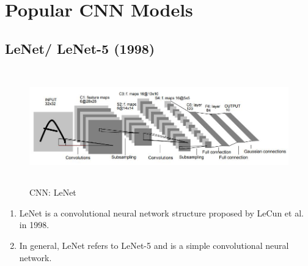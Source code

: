 \chapter{Popular CNN Models}

\section{LeNet/ LeNet-5 (1998) \cite{gfg-convolutional-neural-network-cnn-in-machine-learning,wiki-lenet,ieee/726791/cnn-lenet,medium/lenet-5-complete-architecture-84c6d08215f9}}\label{cnn: LeNet}

\begin{figure}[h]
    \centering
    \includegraphics[width=\linewidth, height=5cm, keepaspectratio]{Pictures/convolutional-neural-network/LeNet_Original_Image.jpg}
    \caption{CNN: LeNet}
\end{figure}

\begin{enumerate}
    \item LeNet is a convolutional neural network structure proposed by LeCun et al. in 1998. \cite{ieee/726791/cnn-lenet}
    
    
    \item In general, LeNet refers to LeNet-5 and is a simple convolutional neural network.
\end{enumerate}

